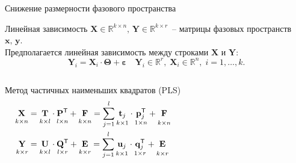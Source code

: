 \documentclass[9pt]{beamer}
\newcommand{\bx}{\mathbf{x}}
\newcommand{\by}{\mathbf{y}}
\newcommand{\bY}{\mathbf{Y}}
\newcommand{\bX}{\mathbf{X}}
\newcommand{\bu}{\mathbf{u}}
\newcommand{\bt}{\mathbf{t}}
\newcommand{\bp}{\mathbf{p}}
\newcommand{\bq}{\mathbf{q}}
\newcommand{\bP}{\mathbf{P}}
\newcommand{\bT}{\mathbf{T}}
\newcommand{\bQ}{\mathbf{Q}}
\newcommand{\bE}{\mathbf{E}}
\newcommand{\bF}{\mathbf{F}}
\newcommand{\bU}{\mathbf{U}}
\newcommand{\bbR}{\mathbb{R}}
\newcommand{\T}{\mathsf{T}}
\begin{document}
\begin{frame}{Снижение размерности фазового пространства}


\begin{block}{Линейная зависимость}
\vspace{0.1cm}
	$\bX\in\bbR^{k\times n},\, \bY\in\bbR^{k\times r}$~-- матрицы фазовых пространств $\bx,\,\by$.\\
	Предполагается линейная зависимость между строками $\bX$ и $\bY$:
	\[
	    \mathbf{Y}_i = \mathbf{X}_i\cdot\mathbf{\Theta} + \boldsymbol{\varepsilon} \quad \mathbf{Y}_i\in\bbR^r,\;\mathbf{X}_i\in\bbR^n,\; i = 1,\ldots,k.
	\]
\end{block}
\vspace{-0.3cm}
\begin{columns}
\begin{block}{Метод частичных наименьших квадратов (PLS)}
	\vspace{-0.5cm}
\begin{align*}
\underset{k \times n}{\vphantom{\bQ}\bX} 
&= \underset{k \times l}{\vphantom{\bQ}\bT} \cdot \underset{l \times n}{\vphantom{\bQ}\bP^{\T}} + \underset{k \times n}{\vphantom{\bQ}\bF} 
= \sum_{j=1}^l \underset{k \times 1}{\vphantom{\bp_j^{\T}}\bt_j} \cdot \underset{1 \times n}{\bp_j^{\T}} + \underset{k \times n}{\vphantom{\bp_j^{\T}}\bF}\\
\underset{k \times r}{\vphantom{\bQ}\bY} 
&= \underset{k \times l}{\vphantom{\bQ}\bU} \cdot \underset{l \times r}{\bQ^{\T}} + \underset{k \times r}{\vphantom{\bQ}\bE}
=  \sum_{j=1}^l  \underset{k \times 1}{\vphantom{\bq_j^{\T}}\bu_j} \cdot \underset{1 \times r}{\bq_j^{\T}} +  \underset{k\times r}{\vphantom{\bq_j^{\T}}\bE}
\end{align*}
\end{block}


\end{columns}
\end{frame}
\end{document}
